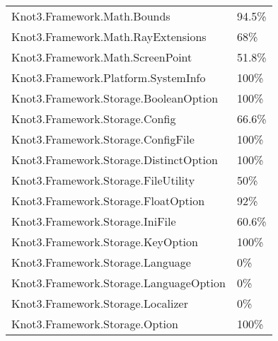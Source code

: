 \documentclass[a4paper,10pt]{article}
\begin{document}
\begin{longtable}[l]{ll}
Knot3.Framework.Math.Bounds & 94.5\%\\
Knot3.Framework.Math.RayExtensions & 68\%\\
Knot3.Framework.Math.ScreenPoint & 51.8\%\\
Knot3.Framework.Platform.SystemInfo & 100\%\\
Knot3.Framework.Storage.BooleanOption & 100\%\\
Knot3.Framework.Storage.Config & 66.6\%\\
Knot3.Framework.Storage.ConfigFile & 100\%\\
Knot3.Framework.Storage.DistinctOption & 100\%\\
Knot3.Framework.Storage.FileUtility & 50\%\\
Knot3.Framework.Storage.FloatOption & 92\%\\
Knot3.Framework.Storage.IniFile & 60.6\%\\
Knot3.Framework.Storage.KeyOption & 100\%\\
Knot3.Framework.Storage.Language & 0\%\\
Knot3.Framework.Storage.LanguageOption & 0\%\\
Knot3.Framework.Storage.Localizer & 0\%\\
Knot3.Framework.Storage.Option & 100\%\\
\end{longtable}
\end{document}
